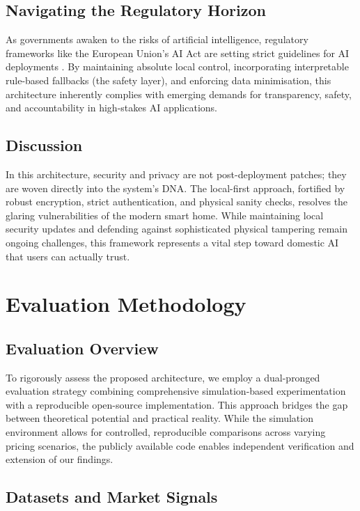 \documentclass[11pt,a4paper]{article}
\begin{document}
\subsection{Navigating the Regulatory Horizon}

As governments awaken to the risks of artificial intelligence, regulatory frameworks like the European Union's AI Act are setting strict guidelines for AI deployments \cite{eu2021ai}. By maintaining absolute local control, incorporating interpretable rule-based fallbacks (the safety layer), and enforcing data minimisation, this architecture inherently complies with emerging demands for transparency, safety, and accountability in high-stakes AI applications.

\subsection{Discussion}

In this architecture, security and privacy are not post-deployment patches; they are woven directly into the system's DNA. The local-first approach, fortified by robust encryption, strict authentication, and physical sanity checks, resolves the glaring vulnerabilities of the modern smart home. While maintaining local security updates and defending against sophisticated physical tampering remain ongoing challenges, this framework represents a vital step toward domestic AI that users can actually trust.

\section{Evaluation Methodology}

\subsection{Evaluation Overview}

To rigorously assess the proposed architecture, we employ a dual-pronged evaluation strategy combining comprehensive simulation-based experimentation with a reproducible open-source implementation. This approach bridges the gap between theoretical potential and practical reality. While the simulation environment allows for controlled, reproducible comparisons across varying pricing scenarios, the publicly available code enables independent verification and extension of our findings.

\subsection{Datasets and Market Signals}
\end{document}
